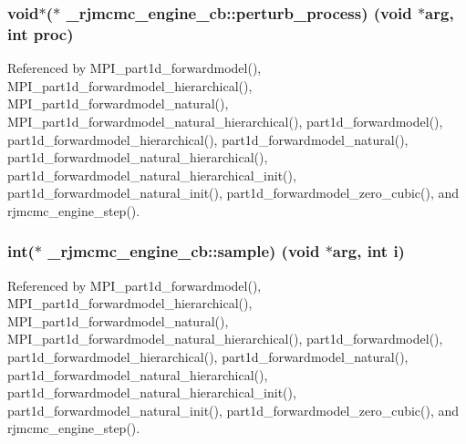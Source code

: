 \subsubsection[{\texorpdfstring{perturb\+\_\+process}{perturb_process}}]{\setlength{\rightskip}{0pt plus 5cm}void$\ast$($\ast$ \+\_\+rjmcmc\+\_\+engine\+\_\+cb\+::perturb\+\_\+process) (void $\ast${\bf arg}, int proc)}\hypertarget{struct__rjmcmc__engine__cb_a69d829afbd1ad49c4bcc17727d5d8a67}{}\label{struct__rjmcmc__engine__cb_a69d829afbd1ad49c4bcc17727d5d8a67}


Referenced by M\+P\+I\+\_\+part1d\+\_\+forwardmodel(), M\+P\+I\+\_\+part1d\+\_\+forwardmodel\+\_\+hierarchical(), M\+P\+I\+\_\+part1d\+\_\+forwardmodel\+\_\+natural(), M\+P\+I\+\_\+part1d\+\_\+forwardmodel\+\_\+natural\+\_\+hierarchical(), part1d\+\_\+forwardmodel(), part1d\+\_\+forwardmodel\+\_\+hierarchical(), part1d\+\_\+forwardmodel\+\_\+natural(), part1d\+\_\+forwardmodel\+\_\+natural\+\_\+hierarchical(), part1d\+\_\+forwardmodel\+\_\+natural\+\_\+hierarchical\+\_\+init(), part1d\+\_\+forwardmodel\+\_\+natural\+\_\+init(), part1d\+\_\+forwardmodel\+\_\+zero\+\_\+cubic(), and rjmcmc\+\_\+engine\+\_\+step().

\subsubsection[{\texorpdfstring{sample}{sample}}]{\setlength{\rightskip}{0pt plus 5cm}int($\ast$ \+\_\+rjmcmc\+\_\+engine\+\_\+cb\+::sample) (void $\ast${\bf arg}, int {\bf i})}\hypertarget{struct__rjmcmc__engine__cb_a6a85b9af744cef99827ea3cc7aebfa3b}{}\label{struct__rjmcmc__engine__cb_a6a85b9af744cef99827ea3cc7aebfa3b}


Referenced by M\+P\+I\+\_\+part1d\+\_\+forwardmodel(), M\+P\+I\+\_\+part1d\+\_\+forwardmodel\+\_\+hierarchical(), M\+P\+I\+\_\+part1d\+\_\+forwardmodel\+\_\+natural(), M\+P\+I\+\_\+part1d\+\_\+forwardmodel\+\_\+natural\+\_\+hierarchical(), part1d\+\_\+forwardmodel(), part1d\+\_\+forwardmodel\+\_\+hierarchical(), part1d\+\_\+forwardmodel\+\_\+natural(), part1d\+\_\+forwardmodel\+\_\+natural\+\_\+hierarchical(), part1d\+\_\+forwardmodel\+\_\+natural\+\_\+hierarchical\+\_\+init(), part1d\+\_\+forwardmodel\+\_\+natural\+\_\+init(), part1d\+\_\+forwardmodel\+\_\+zero\+\_\+cubic(), and rjmcmc\+\_\+engine\+\_\+step().

